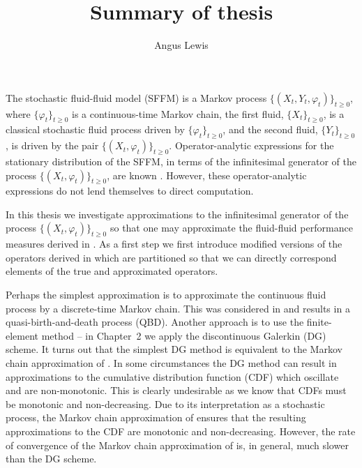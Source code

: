 \documentclass[a4paper]{article}
\title{Summary of thesis}
\author{Angus Lewis}
\begin{document}
\maketitle
The stochastic fluid-fluid model (SFFM) is a Markov process {\(\{(X_t,Y_t,\varphi_t)\}_{t\geq 0}\),} where {\(\{\varphi_t\}_{t\geq 0}\)} is a continuous-time Markov chain, the first fluid, {\(\{X_t\}_{t\geq 0}\),} is a classical stochastic fluid process driven by {\(\{\varphi_t\}_{t\geq0}\),} and the second fluid, {\(\{Y_t\}_{t\geq0}\),} is driven by the pair {\(\{(X_t,\varphi_t)\}_{t\geq 0}\).} Operator-analytic expressions for the stationary distribution of the SFFM, in terms of the infinitesimal generator of the process {\(\{(X_t,\varphi_t)\}_{t\geq 0}\),} are known \cite{bo2014}. However, these operator-analytic expressions do not lend themselves to direct computation. 

In this thesis we investigate approximations to the infinitesimal generator of the process {\(\{(X_t,\varphi_t)\}_{t\geq 0}\)} so that one may approximate the fluid-fluid performance measures derived in \cite{bo2014}. As a first step we first introduce modified versions of the operators derived in \cite{bo2014} which are partitioned so that we can directly correspond elements of the true and approximated operators.

Perhaps the simplest approximation is to approximate the continuous fluid process by a discrete-time Markov chain. This was considered in \cite{bo2013} and results in a quasi-birth-and-death process (QBD). Another approach is to use the finite-element method -- in Chapter~2 we apply the discontinuous Galerkin (DG) scheme. It turns out that the simplest DG method is equivalent to the Markov chain approximation of \cite{bo2013}. In some circumstances the DG method can result in approximations to the cumulative distribution function (CDF) which oscillate and are non-monotonic. This is clearly undesirable as we know that CDFs must be monotonic and non-decreasing. Due to its interpretation as a stochastic process, the Markov chain approximation of \cite{bo2013} ensures that the resulting approximations to the CDF are monotonic and non-decreasing. However, the rate of convergence of the Markov chain approximation of \cite{bo2013} is, in general, much slower than the DG scheme. 
\end{document}
